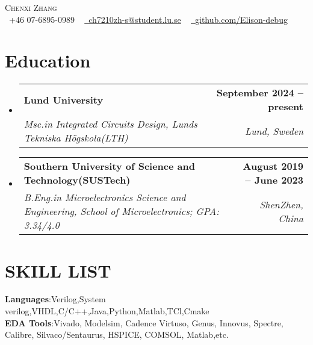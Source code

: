 \documentclass[letterpaper,11pt]{article}
\makeatletter
\newcommand{\resumeSubheading}[4]{
	\vspace{-2pt}\item
	\begin{tabular*}{1.0\textwidth}[t]{l@{\extracolsep{\fill}}r}
		\textbf{#1} & \textbf{\small #2} \\
		\textit{\small#3} & \textit{\small #4} \\
	\end{tabular*}\vspace{-7pt}
}
\newcommand{\resumeSubHeadingListStart}{\begin{itemize}[leftmargin=0.0in, label={}]}
\newcommand{\resumeSubHeadingListEnd}{\end{itemize}}
\makeatother
\begin{document}
	
	
	\begin{center}
		{\Huge \scshape Chenxi Zhang} \\ \vspace{1pt}
		\small \raisebox{-0.1\height}\faPhone\ +46 07-6895-0989 ~ \href{mailto:ch7210zh-s@student.lu.se}{\raisebox{-0.2\height}\faEnvelope\  \underline{ch7210zh-s@student.lu.se}} ~ 
		\href{https://github.com/Elison-debug}{\raisebox{-0.2\height}\faGithub\ \underline{github.com/Elison-debug}}
		\vspace{-8pt}
	\end{center}
	
	
	\section{Education}
	\resumeSubHeadingListStart
	\resumeSubheading
	{Lund University}{September 2024 -- present}
	{Msc.in Integrated Circuits Design, Lunds Tekniska Högskola(LTH)}{Lund, Sweden}
	
	\resumeSubheading
	{Southern University of Science and Technology(SUSTech)}{August 2019 -- June 2023}
	{B.Eng.in Microelectronics Science and Engineering, School of Microelectronics; GPA: 3.34/4.0}{ShenZhen, China}
	\resumeSubHeadingListEnd
	

	\section{SKILL LIST}
	\begin{itemize}[leftmargin=0.15in, label={}]
		\small{\item{
				\textbf{Languages}{:Verilog,System verilog,VHDL,C/C++,Java,Python,Matlab,TCl,Cmake} \\
				\textbf{EDA Tools}{:Vivado, Modelsim, Cadence Virtuso, Genus, Innovus, Spectre, Calibre, Silvaco/Sentaurus, HSPICE, COMSOL, Matlab,etc. } \\
		}}
	\end{itemize}
	\vspace{-17pt}
	
\end{document}
